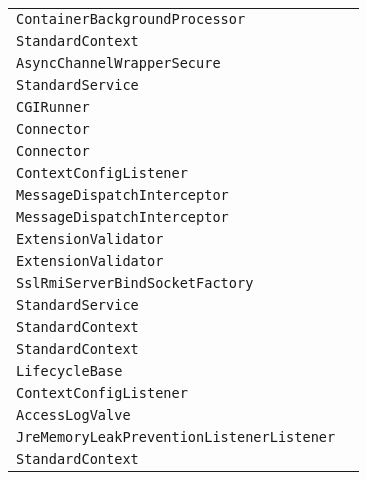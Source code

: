 \begin{center}
\begin{tabular}{ll}
\lstinline/ContainerBackgroundProcessor/&\raisebox{0pt}{\lstinline/ processChildren(Container)/}\\ 
\lstinline/StandardContext/&\raisebox{0pt}{\lstinline/ checkUnusualURLPattern(String)/}\\ 
\lstinline/AsyncChannelWrapperSecure/&\raisebox{0pt}{\lstinline/ close()/}\\ 
\lstinline/StandardService/&\raisebox{0pt}{\lstinline/ stopInternal())/}\\ 
\lstinline/CGIRunner/&\raisebox{0pt}{\lstinline/ sendToLog(BufferedReaderrdr)/}\\ 
\lstinline/Connector/&\raisebox{0pt}{\lstinline/ resume()/}\\ 
\lstinline/Connector/&\raisebox{0pt}{\lstinline/ resume()/}\\ 
\lstinline/ContextConfigListener/&\raisebox{0pt}{\lstinline/ processAnnotationsFile(File)/}\\ 
\lstinline/MessageDispatchInterceptor/&\raisebox{0pt}{\lstinline/ sendAsyncData()/}\\ 
\lstinline/MessageDispatchInterceptor/&\raisebox{0pt}{\lstinline/ sendAsyncData()/}\\ 
\lstinline/ExtensionValidator/&\raisebox{0pt}{\lstinline/ addFolderList(Stringproperty)/}\\ 
\lstinline/ExtensionValidator/&\raisebox{0pt}{\lstinline/ addFolderList(Stringproperty)/}\\ 
\lstinline/SslRmiServerBindSocketFactory/&\raisebox{0pt}{\lstinline/ serverBindSocketFactory(String)/}\\ 
\lstinline/StandardService/&\raisebox{0pt}{\lstinline/ stopInternal())/}\\ 
\lstinline/StandardContext/&\raisebox{0pt}{\lstinline/ checkUnusualURLPattern(String)/}\\ 
\lstinline/StandardContext/&\raisebox{0pt}{\lstinline/ checkUnusualURLPattern(String)/}\\ 
\lstinline/LifecycleBase/&\raisebox{0pt}{\lstinline/ handleSubClassException(Throwable))/}\\ 
\lstinline/ContextConfigListener/&\raisebox{0pt}{\lstinline/ processAnnotationsFile(File)/}\\ 
\lstinline/AccessLogValve/&\raisebox{0pt}{\lstinline/ open()/}\\ 
\lstinline/JreMemoryLeakPreventionListenerListener/&\raisebox{0pt}{\lstinline/ lifecycleEvent(LifecycleEvent)/}\\ 
\lstinline/StandardContext/&\raisebox{0pt}{\lstinline/ checkUnusualURLPattern(String)/}\\ 

\end{tabular}
\end{center}

